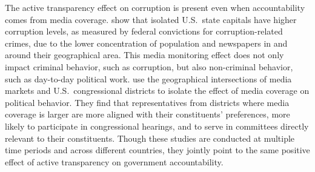 \documentclass[11pt]{article}
\begin{document}
The active transparency effect on corruption is present even when accountability comes from media coverage. \citet{CampanteIsolatedCapitalCities2014} show that isolated U.S.~state capitals have higher corruption levels, as measured by federal convictions for corruption-related crimes, due to the lower concentration of population and newspapers in and around their geographical area. This media monitoring effect does not only impact criminal behavior, such as corruption, but also non-criminal behavior, such as day-to-day political work. \citet{SnyderJrPressCoveragePolitical2010} use the geographical intersections of media markets and U.S.~congressional districts to isolate the effect of media coverage on political behavior. They find that representatives from districts where media coverage is larger are more aligned with their constituents' preferences, more likely to participate in congressional hearings, and to serve in committees directly relevant to their constituents. Though these studies  are conducted at multiple time periods and across different countries, they jointly point to the same positive effect of active transparency on government accountability.
\end{document}
